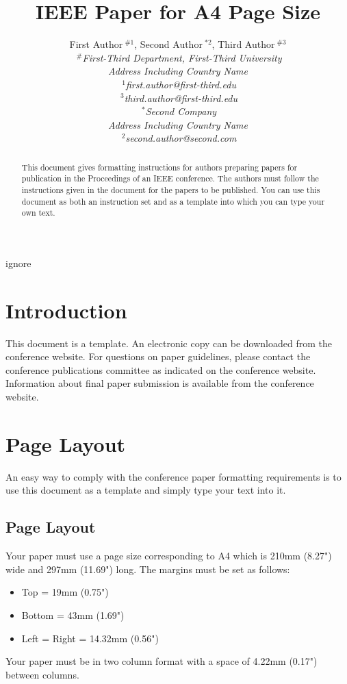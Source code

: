 \documentclass[10pt,conference,a4paper]{IEEEtran}
\title{ IEEE Paper for A4 Page Size}
\author{%
{First Author{\small $~^{\#1}$}, Second Author{\small $~^{*2}$}, Third Author{\small $~^{\#3}$} }%
\vspace{1.6mm}\\
\fontsize{10}{10}\selectfont\itshape
$~^{\#}$First-Third Department, First-Third University\\
Address Including Country Name\\
\fontsize{9}{9}\selectfont\ttfamily\upshape
$~^{1}$first.author@first-third.edu\\
$~^{3}$third.author@first-third.edu%
\vspace{1.2mm}\\
\fontsize{10}{10}\selectfont\rmfamily\itshape
$~^{*}$Second Company\\
Address Including Country Name\\
\fontsize{9}{9}\selectfont\ttfamily\upshape
$~^{2}$second.author@second.com
}
\begin{document}
\maketitle
%
\begin{abstract} 
This document gives formatting instructions for authors preparing
papers for publication in the Proceedings of an IEEE conference.  The
authors must follow the instructions given in the document for the
papers to be published.  You can use this document as both an
instruction set and as a template into which you can type your own
text.
\end{abstract}

\begin{keywords}
ignore
\end{keywords}
%
\section{Introduction}
%
This document is a template.  An electronic copy can be downloaded
from the conference website.  For questions on paper guidelines,
please contact the conference publications committee as indicated on
the conference website.  Information about final paper submission is
available from the conference website.

\section{Page Layout}

An easy way to comply with the conference paper formatting
requirements is to use this document as a template and simply
type your text into it.  

\subsection{Page Layout}

Your paper must use a page size corresponding to A4 which is
210mm (8.27") wide and 297mm (11.69") long.  The margins must be
set as follows:

\begin{itemize}
\item	Top = 19mm (0.75")
\item	Bottom = 43mm (1.69")
\item	Left = Right = 14.32mm (0.56")
\end{itemize}

Your paper must be in two column format with a space of 4.22mm
(0.17") between columns. 
\end{document}
